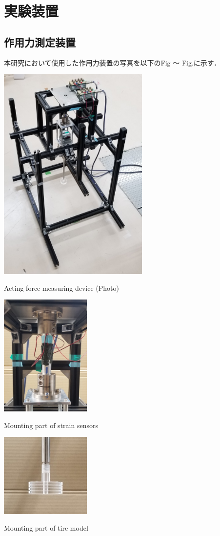 \section{実験装置}

\subsection{作用力測定装置}
本研究において使用した作用力装置の写真を以下のFig ～ Fig.に示す．

\begin{multicols}{2}
    \begin{figure_here}
        \centering
        \includegraphics[width=75mm]{images/21-1.png}
        \caption{Acting force measuring device (Photo)} 
    \end{figure_here}
    \begin{figure_here}
        \centering
        \includegraphics[width=45mm]{images/21-2.png}
        \caption{Mounting part of strain sensors} 
        \includegraphics[width=45mm]{images/21-3.png}
        \caption{Mounting part of tire model} 
    \end{figure_here}
\end{multicols}

